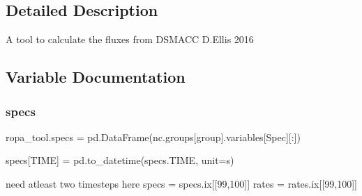 \subsection{Detailed Description}
\begin{DoxyVerb}A tool to calculate the fluxes from DSMACC
D.Ellis 2016
\end{DoxyVerb}
 

\subsection{Variable Documentation}
\mbox{\label{namespaceropa__tool_aa744f70435f5581e7e9d31783776f50c}} 
\subsubsection{\texorpdfstring{specs}{specs}}
{\footnotesize\ttfamily ropa\+\_\+tool.\+specs = pd.\+Data\+Frame(nc.\+groups\mbox{[}group\mbox{]}.variables\mbox{[}\textquotesingle{}Spec\textquotesingle{}\mbox{]}\mbox{[}\+:\mbox{]})}



specs\mbox{[}\textquotesingle{}T\+I\+ME\textquotesingle{}\mbox{]} = pd.\+to\+\_\+datetime(specs.\+T\+I\+ME, unit=\textquotesingle{}s\textquotesingle{}) 

need atleast two timesteps here specs = specs.\+ix\mbox{[}\mbox{[}99,100\mbox{]}\mbox{]} rates = rates.\+ix\mbox{[}\mbox{[}99,100\mbox{]}\mbox{]} 